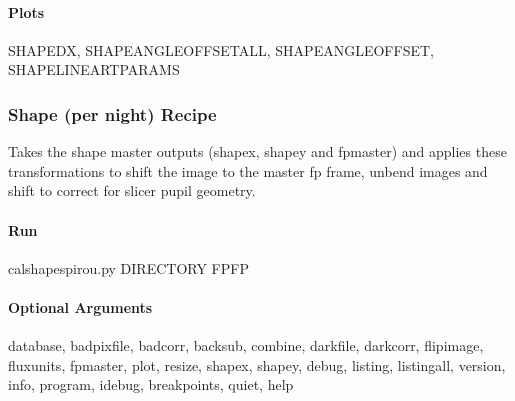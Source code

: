 \documentclass[a4paper,10pt,english]{report}
\begin{document}
\paragraph{Plots}
\label{\detokenize{user/spirou/recipes/shape_master:plots}}
\begin{sphinxVerbatim}[commandchars=\\\{\}]
SHAPE\PYGZus{}DX, SHAPE\PYGZus{}ANGLE\PYGZus{}OFFSET\PYGZus{}ALL, SHAPE\PYGZus{}ANGLE\PYGZus{}OFFSET, SHAPE\PYGZus{}LINEAR\PYGZus{}TPARAMS
\end{sphinxVerbatim}


\subsubsection{Shape (per night) Recipe}
\label{\detokenize{user/spirou/recipes/shape_local:shape-per-night-recipe}}\label{\detokenize{user/spirou/recipes/shape_local:recipes-spirou-shape-local}}\label{\detokenize{user/spirou/recipes/shape_local::doc}}
Takes the shape master outputs (shapex, shapey and fpmaster) and applies
these transformations to shift the image to the master fp frame, unbend images
and shift to correct for slicer pupil geometry.


\paragraph{Run}
\label{\detokenize{user/spirou/recipes/shape_local:run}}
\begin{sphinxVerbatim}[commandchars=\\\{\}]
cal\PYGZus{}shape\PYGZus{}spirou.py \PYG{o}{[}DIRECTORY\PYG{o}{]} \PYG{o}{[}FP\PYGZus{}FP\PYG{o}{]}
\end{sphinxVerbatim}


\paragraph{Optional Arguments}
\label{\detokenize{user/spirou/recipes/shape_local:optional-arguments}}
\begin{sphinxVerbatim}[commandchars=\\\{\}]
\PYGZhy{}\PYGZhy{}database, \PYGZhy{}\PYGZhy{}badpixfile, \PYGZhy{}\PYGZhy{}badcorr, \PYGZhy{}\PYGZhy{}backsub, \PYGZhy{}\PYGZhy{}combine,
\PYGZhy{}\PYGZhy{}darkfile, \PYGZhy{}\PYGZhy{}darkcorr,  \PYGZhy{}\PYGZhy{}flipimage, \PYGZhy{}\PYGZhy{}fluxunits, \PYGZhy{}\PYGZhy{}fpmaster,
\PYGZhy{}\PYGZhy{}plot, \PYGZhy{}\PYGZhy{}resize, \PYGZhy{}\PYGZhy{}shapex, \PYGZhy{}\PYGZhy{}shapey,
\PYGZhy{}\PYGZhy{}debug, \PYGZhy{}\PYGZhy{}listing, \PYGZhy{}\PYGZhy{}listingall, \PYGZhy{}\PYGZhy{}version, \PYGZhy{}\PYGZhy{}info,
\PYGZhy{}\PYGZhy{}program, \PYGZhy{}\PYGZhy{}idebug, \PYGZhy{}\PYGZhy{}breakpoints, \PYGZhy{}\PYGZhy{}quiet, \PYGZhy{}\PYGZhy{}help
\end{sphinxVerbatim}
\end{document}
